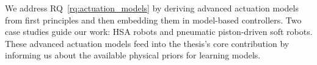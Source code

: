 
We address \gls{RQ}~\ref{rq:actuation_models} by deriving advanced actuation models from first principles and then embedding them in model-based controllers. Two case studies guide our work: \gls{HSA} robots and pneumatic piston-driven soft robots. These advanced actuation models feed into the thesis’s core contribution by informing us about the available physical priors for learning models.

